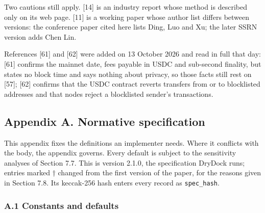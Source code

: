 Two cautions still apply. {[}14{]} is an industry report whose method is described only on its web page. {[}11{]} is a working paper whose author list differs between versions: the conference paper cited here lists Ding, Luo and Xu; the later SSRN version adds Chen Lin.

References {[}61{]} and {[}62{]} were added on 13 October 2026 and read in full that day: {[}61{]} confirms the mainnet date, fees payable in USDC and sub-second finality, but states no block time and says nothing about privacy, so those facts still rest on {[}57{]}; {[}62{]} confirms that the USDC contract reverts transfers from or to blocklisted addresses and that nodes reject a blocklisted sender's transactions.

\subsection{Appendix A. Normative specification}\label{appendix-a.-normative-specification}

This appendix fixes the definitions an implementer needs. Where it conflicts with the body, the appendix governs. Every default is subject to the sensitivity analyses of Section 7.7. This is version 2.1.0, the specification DryDock runs; entries marked † changed from the first version of the paper, for the reasons given in Section 7.8. Its keccak-256 hash enters every record as \texttt{spec\_hash}.

\subsubsection{A.1 Constants and defaults}\label{a.1-constants-and-defaults}

